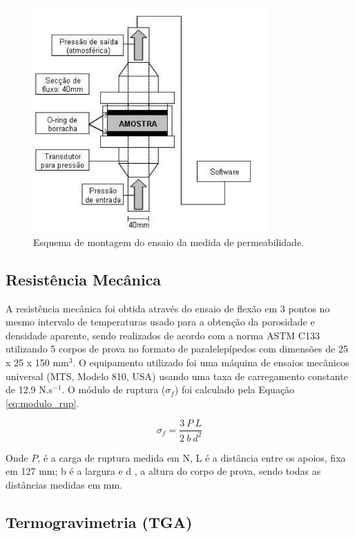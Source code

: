 \begin{figure}[ht]
	\centering
	\includegraphics[width=9cm]{./figures/perm.pdf}
	\caption{Esquema de montagem do ensaio da medida de
    permeabilidade. \label{fig:perm}}
\end{figure}

   

\subsection{Resistência Mecânica}\label{mat:rm}
A resistência mecânica foi obtida através do ensaio de flexão em 3 pontos no
mesmo intervalo de temperaturas usado para a obtenção da porosidade e densidade
aparente, sendo realizados de acordo com a norma ASTM C133 utilizando 5 corpos
de prova no formato de paralelepípedos com dimensões de 25 x 25 x 150 mm$^3$. O
equipamento utilizado foi uma máquina de ensaios mecânicos universal (MTS,
Modelo 810, USA) usando uma taxa de carregamento constante de 12.9 N.s$^{-1}$. O
módulo de ruptura ($\sigma_f$) foi calculado pela Equação \ref{eq:modulo_rup}.

\begin{equation}
  \label{eq:modulo_rup}
  \sigma_f = \frac{3 \ P \ L}{2 \ b \ d^2}
\end{equation}

Onde $P$, é a carga de ruptura medida em N, L é a distância entre os apoios,
fixa em 127 mm; b é a largura e d , a altura do corpo de prova, sendo todas as
distâncias medidas em mm.
    
\subsection{Termogravimetria (TGA)}\label{mat:TGA}
    
